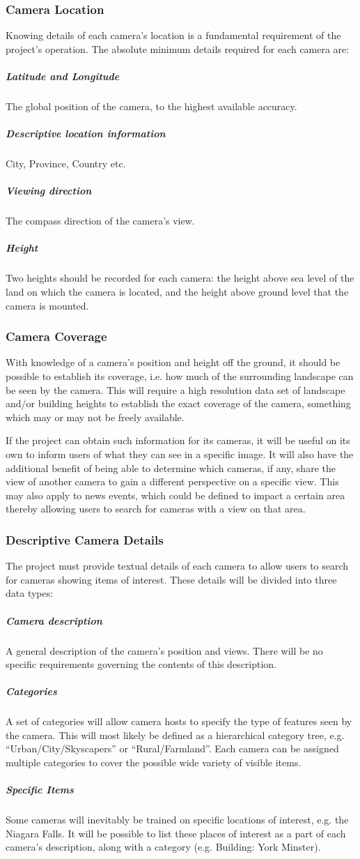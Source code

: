 \documentclass[11pt]{article}
\begin{document}
\subsubsection{Camera Location}
Knowing details of each camera's location is a fundamental requirement of the project's operation. The absolute minimum details required for each camera are:

\subparagraph{Latitude and Longitude} The global position of the camera, to the highest available accuracy.
\subparagraph{Descriptive location information} City, Province, Country etc.
\subparagraph{Viewing direction} The compass direction of the camera's view.
\subparagraph{Height} Two heights should be recorded for each camera: the height above sea level of the land on which the camera is located, and the height above ground level that the camera is mounted.

\subsubsection{Camera Coverage}
With knowledge of a camera's position and height off the ground, it should be possible to establish its coverage, i.e. how much of the surrounding landscape can be seen by the camera. This will require a high resolution data set of landscape and/or building heights to establish the exact coverage of the camera, something which may or may not be freely available.

If the project can obtain such information for its cameras, it will be useful on its own to inform users of what they can see in a specific image. It will also have the additional benefit of being able to determine which cameras, if any, share the view of another camera to gain a different perspective on a specific view. This may also apply to news events, which could be defined to impact a certain area thereby allowing users to search for cameras with a view on that area.

\subsubsection{Descriptive Camera Details}
The project must provide textual details of each camera to allow users to search for cameras showing items of interest. These details will be divided into three data types:

\subparagraph{Camera description} A general description of the camera's position and views. There will be no specific requirements governing the contents of this description.
\subparagraph{Categories} A set of categories will allow camera hosts to specify the type of features seen by the camera. This will most likely be defined as a hierarchical category tree, e.g. ``Urban/City/Skyscapers'' or ``Rural/Farmland''. Each camera can be assigned multiple categories to cover the possible wide variety of visible items.
\subparagraph{Specific Items} Some cameras will inevitably be trained on specific locations of interest, e.g. the Niagara Falls. It will be possible to list these places of interest as a part of each camera's description, along with a category (e.g. Building: York Minster).
\end{document}
